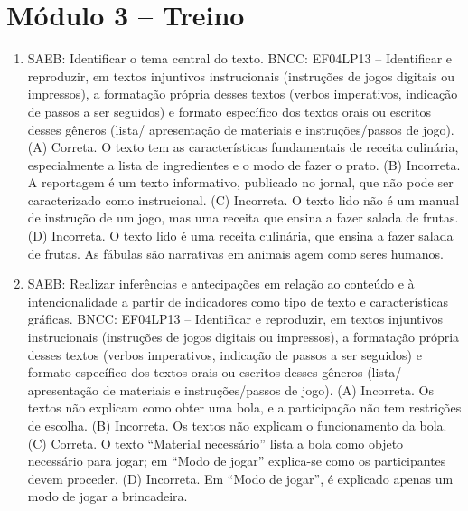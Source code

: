 \section*{Módulo 3 – Treino}

\begin{enumerate}
\item
SAEB: Identificar o tema central do texto.
BNCC: EF04LP13 -- Identificar e reproduzir, em textos injuntivos
instrucionais (instruções de jogos digitais ou impressos), a formatação
própria desses textos (verbos imperativos, indicação de passos a ser
seguidos) e formato específico dos textos orais ou escritos desses
gêneros (lista/ apresentação de materiais e instruções/passos de jogo).
(A) Correta. O texto tem as características fundamentais de receita
culinária, especialmente a lista de ingredientes e o modo de fazer o prato.
(B) Incorreta. A reportagem é um texto informativo, publicado no jornal, 
que não pode ser caracterizado como instrucional.
(C) Incorreta. O texto lido não é um manual de instrução de um jogo, mas
uma receita que ensina a fazer salada de frutas.  
(D) Incorreta. O texto lido é uma receita culinária, que ensina a fazer 
salada de frutas. As fábulas são narrativas em animais agem como seres
humanos.

\item
SAEB: Realizar inferências e antecipações em relação ao conteúdo e
à intencionalidade a partir de indicadores como tipo de texto e
características gráficas.
BNCC: EF04LP13 -- Identificar e reproduzir, em textos injuntivos
instrucionais (instruções de jogos digitais ou impressos), a formatação
própria desses textos (verbos imperativos, indicação de passos a ser
seguidos) e formato específico dos textos orais ou escritos desses
gêneros (lista/ apresentação de materiais e instruções/passos de jogo).
(A) Incorreta. Os textos não explicam como obter uma bola, e a 
participação não tem restrições de escolha.  
(B) Incorreta. Os textos não explicam o funcionamento da bola.
(C) Correta. O texto ``Material necessário'' lista a bola como objeto 
necessário para jogar; em ``Modo de jogar'' explica-se como os 
participantes devem proceder.
(D) Incorreta. Em ``Modo de jogar'', é explicado apenas um modo de jogar
a brincadeira.


\end{enumerate}
